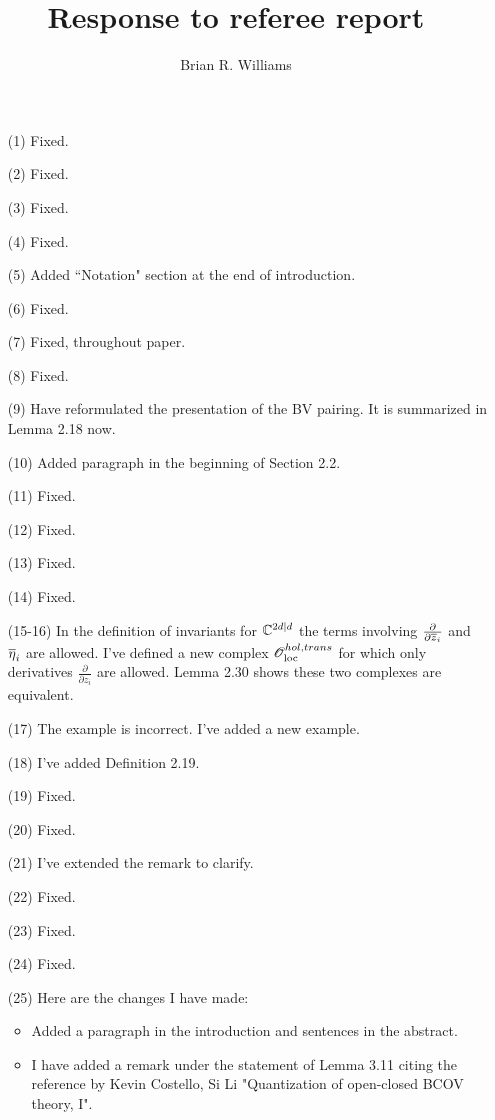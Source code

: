 \documentclass[10pt]{amsart}
\title{Response to referee report}
\author{Brian R. Williams}
\date{}
\begin{document}
\maketitle

\begin{itemize}
\item[(1)] Fixed.
\item[(2)] Fixed.
\item[(3)] Fixed.
\item[(4)] Fixed.
\item[(5)] Added ``Notation" section at the end of introduction. 
\item[(6)] Fixed.
\item[(7)] Fixed, throughout paper. 
\item[(8)] Fixed.
\item[(9)] Have reformulated the presentation of the BV pairing. 
It is summarized in Lemma 2.18 now.
\item[(10)] Added paragraph in the beginning of Section 2.2. 
\item[(11)] Fixed.
\item[(12)] Fixed.
\item[(13)] Fixed.
\item[(14)] Fixed.
\item[(15-16)] In the definition of invariants for $\CC^{2d|d}$ the terms involving $\frac{\partial}{\partial \zbar_i}$ and $\Bar{\eta}_i$ are allowed. 
I've defined a new complex $\sO_{\rm loc}^{hol,trans}$ for which only derivatives $\frac{\partial}{\partial z_i}$ are allowed.
Lemma 2.30 shows these two complexes are equivalent. 
\item[(17)] The example is incorrect. I've added a new example. 
\item[(18)] I've added Definition 2.19. 
\item[(19)] Fixed.
\item[(20)] Fixed.
\item[(21)] I've extended the remark to clarify. 
\item[(22)]Fixed.
\item[(23)] Fixed.
\item[(24)] Fixed.
\item[(25)] Here are the changes I have made:
\begin{itemize}
\item Added a paragraph in the introduction and sentences in the abstract. 
\item I have added a remark under the statement of Lemma 3.11 citing the reference by Kevin Costello, Si Li "Quantization of open-closed BCOV theory, I". 

\end{itemize}
\end{itemize}
\end{document}
